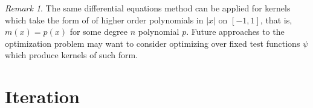 \documentclass[12pt, reqno]{amsart}
\numberwithin{equation}{section}
\theoremstyle{definition}
\theoremstyle{remark}
\newtheorem*{remark}{Remark}
\begin{document}
\begin{remark}
    The same differential equations method can be applied for kernels which take the form of of higher order polynomials in $|x|$ on $[-1, 1]$, that is, $m(x) = p(x)$ for some degree $n$ polynomial $p$. Future approaches to the optimization problem may want to consider optimizing over fixed test functions $\psi$ which produce kernels of such form.
\end{remark}




\section{Iteration}
\end{document}
